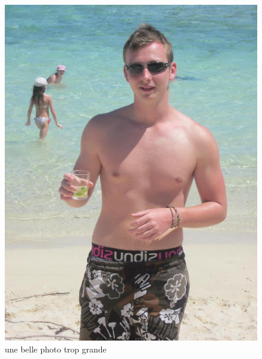 \documentclass[11pt,a4paper]{article}
\begin{document}
\begin{figure}
	\centering
	\includegraphics{photo.jpg}
	\caption{une belle photo trop grande}
	\label{fig:big_photo}
\end{figure}
\end{document}
